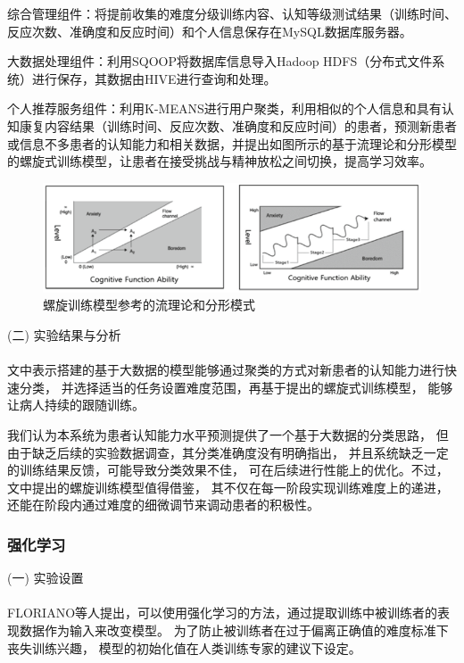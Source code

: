 \documentclass{article}
\begin{document}
            综合管理组件：将提前收集的难度分级训练内容、认知等级测试结果（训练时间、反应次数、准确度和反应时间）和个人信息保存在MySQL数据库服务器。
 
            大数据处理组件：利用SQOOP将数据库信息导入Hadoop HDFS（分布式文件系统）进行保存，其数据由HIVE进行查询和处理。

            个人推荐服务组件：利用K-MEANS进行用户聚类，利用相似的个人信息和具有认知康复内容结果（训练时间、反应次数、准确度和反应时间）的患者，预测新患者或信息不多患者的认知能力和相关数据，并提出如图所示的基于流理论和分形模型的螺旋式训练模型，让患者在接受挑战与精神放松之间切换，提高学习效率。
            \begin{figure}[H]
            	
            	\centering
            	\includegraphics[scale=0.7]{images/flow_theory.png}
            	\caption{螺旋训练模型参考的流理论和分形模式}
            	\label{fig:label}
            \end{figure}
            
            


            (二) 实验结果与分析\paragraph{}
            文中表示搭建的基于大数据的模型能够通过聚类的方式对新患者的认知能力进行快速分类，
            并选择适当的任务设置难度范围，再基于提出的螺旋式训练模型，
            能够让病人持续的跟随训练。

            我们认为本系统为患者认知能力水平预测提供了一个基于大数据的分类思路，
            但由于缺乏后续的实验数据调查，其分类准确度没有明确指出，
            并且系统缺乏一定的训练结果反馈，可能导致分类效果不佳，
            可在后续进行性能上的优化。不过，文中提出的螺旋训练模型值得借鉴，
            其不仅在每一阶段实现训练难度上的递进，
            还能在阶段内通过难度的细微调节来调动患者的积极性。






            \subsubsection{强化学习}
            (一) 实验设置\paragraph{}
            FLORIANO\cite{ref12}等人提出，可以使用强化学习的方法，通过提取训练中被训练者的表现数据作为输入来改变模型。
            为了防止被训练者在过于偏离正确值的难度标准下丧失训练兴趣，
            模型的初始化值在人类训练专家的建议下设定。
\end{document}
